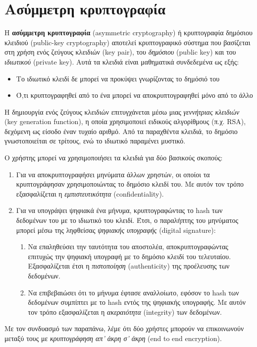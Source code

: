 \section{Ασύμμετρη κρυπτογραφία}

Η \textbf{ασύμμετρη κρυπτογραφία} (asymmetric cryptography) ή κρυπτογραφία δημόσιου κλειδιού (public-key cryptography) αποτελεί κρυπτογραφικό σύστημα που βασίζεται στη χρήση ενός ζεύγους κλειδιών (key pair), του \textit{δημόσιου} (public key) και του \textit{ιδιωτικού} (private key). Αυτά τα κλειδιά είναι μαθηματικά συνδεδεμένα ως εξής:

\begin{itemize}
	\item Το ιδιωτικό κλειδί δε μπορεί να προκύψει γνωρίζοντας το δημόσιό του
	\item Ό,τι κρυπτογραφηθεί από το ένα μπορεί να αποκρυπτογραφηθεί μόνο από το άλλο 
\end{itemize}
	
Η δημιουργία ενός ζεύγους κλειδιών επιτυγχάνεται μέσω μιας \textit{γεννήτριας κλειδιών} (key generation function), η οποία χρησιμοποιεί ειδικούς αλγορίθμους (π.χ. RSA), δεχόμενη ως είσοδο έναν τυχαίο αριθμό. Από τα παραχθέντα κλειδιά, το δημόσιο γνωστοποιείται σε τρίτους, ενώ το ιδιωτικό παραμένει μυστικό.


Ο χρήστης μπορεί να χρησιμοποιήσει τα κλειδιά για δύο βασικούς σκοπούς:

\begin{enumerate}
	\item Για να αποκρυπτογραφήσει μηνύματα άλλων χρηστών, οι οποίοι τα κρυπτογράφησαν χρησιμοποιώντας το δημόσιο κλειδί του. Με αυτόν τον τρόπο εξασφαλίζεται η \textit{εμπιστευτικότητα} (confidentiality).
	\item Για να υπογράψει ψηφιακά ένα μήνυμα, κρυπτογραφώντας το hash των δεδομένων του με το ιδιωτικό του κλειδί. Έτσι, ο παραλήπτης του μηνύματος μπορεί μέσω της ληφθείσας \textit{ψηφιακής υπογραφής} (digital signature):
	\begin{enumerate}
		\item Να επαληθεύσει την ταυτότητα του αποστολέα, αποκρυπτογραφώντας επιτυχώς την ψηφιακή υπογραφή με το δημόσιο κλειδί του τελευταίου. Εξασφαλίζεται έτσι η \textit{πιστοποίηση} (authenticity) της προέλευσης των δεδομένων.
		\item Να επιβεβαιώσει ότι το μήνυμα έφτασε αναλλοίωτο, εφόσον το hash των δεδομένων συμπίπτει με το hash εντός της ψηφιακής υπογραφής. Με αυτόν τον τρόπο εξασφαλίζεται η \textit{ακεραιότητα} (integrity) των δεδομένων.
	\end{enumerate}
\end{enumerate}

Με τον συνδυασμό των παραπάνω, λέμε ότι δύο χρήστες μπορούν να επικοινωνούν μεταξύ τους με \textit{κρυπτογράφηση απ' άκρη σ' άκρη} (end to end encryption).

